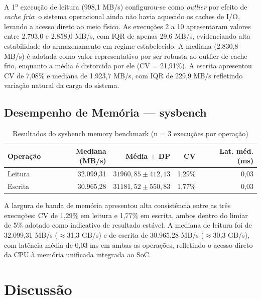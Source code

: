 \documentclass[12pt]{article}
\begin{document}
A 1\textsuperscript{a} execu\c{c}\~ao de leitura (998,1 MB/s) configurou-se
como \textit{outlier} por efeito de \textit{cache frio}: o sistema operacional
ainda n\~ao havia aquecido os caches de I/O, levando a acesso direto ao meio
f\'isico. As execu\c{c}\~oes 2 a 10 apresentaram valores entre 2.793,0 e
2.858,0 MB/s, com IQR de apenas 29,6 MB/s, evidenciando alta estabilidade do
armazenamento em regime estabelecido. A mediana (2.830,8 MB/s) \'e adotada
como valor representativo por ser robusta ao outlier de cache frio, enquanto
a m\'edia \'e distorcida por ele (CV = 21,91\%). A escrita apresentou CV de
7,08\% e mediana de 1.923,7 MB/s, com IQR de 229,9 MB/s refletindo varia\c{c}\~ao
natural da carga do sistema.

\subsection{Desempenho de Mem\'oria --- sysbench}

\begin{table}[ht]
\centering
\caption{Resultados do sysbench memory benchmark (n = 3 execu\c{c}\~oes por opera\c{c}\~ao)}
\label{tab:ram}
\begin{tabular}{lrrrr}
\toprule
\textbf{Opera\c{c}\~ao} & \textbf{Mediana (MB/s)} & \textbf{M\'edia $\pm$ DP} & \textbf{CV} & \textbf{Lat. m\'ed. (ms)} \\
\midrule
Leitura  & 32.099,31 & $31960{,}85 \pm 412{,}13$ & 1,29\% & 0,03 \\
Escrita  & 30.965,28 & $31181{,}52 \pm 550{,}83$ & 1,77\% & 0,03 \\
\bottomrule
\end{tabular}
\end{table}

A largura de banda de mem\'oria apresentou alta consist\^encia entre as tr\^es
execu\c{c}\~oes: CV de 1,29\% em leitura e 1,77\% em escrita, ambos dentro do
limiar de 5\% adotado como indicativo de resultado est\'avel. A mediana de
leitura foi de 32.099,31 MB/s ($\approx$31,3 GB/s) e de escrita de
30.965,28 MB/s ($\approx$30,3 GB/s), com lat\^encia m\'edia de 0,03 ms
em ambas as opera\c{c}\~oes, refletindo o acesso direto da CPU \`a mem\'oria
unificada integrada ao SoC.


\section{Discuss\~ao}
\end{document}
